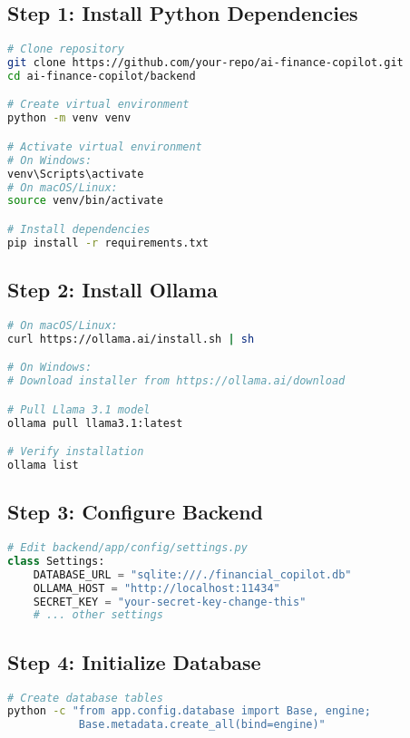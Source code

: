 \documentclass[11pt,a4paper]{report}
\begin{document}
\begin{itemize}

\subsection{Step 1: Install Python Dependencies}
\begin{lstlisting}[language=bash]
# Clone repository
git clone https://github.com/your-repo/ai-finance-copilot.git
cd ai-finance-copilot/backend

# Create virtual environment
python -m venv venv

# Activate virtual environment
# On Windows:
venv\Scripts\activate
# On macOS/Linux:
source venv/bin/activate

# Install dependencies
pip install -r requirements.txt
\end{lstlisting}

\subsection{Step 2: Install Ollama}
\begin{lstlisting}[language=bash]
# On macOS/Linux:
curl https://ollama.ai/install.sh | sh

# On Windows:
# Download installer from https://ollama.ai/download

# Pull Llama 3.1 model
ollama pull llama3.1:latest

# Verify installation
ollama list
\end{lstlisting}

\subsection{Step 3: Configure Backend}
\begin{lstlisting}[language=Python]
# Edit backend/app/config/settings.py
class Settings:
    DATABASE_URL = "sqlite:///./financial_copilot.db"
    OLLAMA_HOST = "http://localhost:11434"
    SECRET_KEY = "your-secret-key-change-this"
    # ... other settings
\end{lstlisting}

\subsection{Step 4: Initialize Database}
\begin{lstlisting}[language=bash]
# Create database tables
python -c "from app.config.database import Base, engine; 
           Base.metadata.create_all(bind=engine)"
\end{lstlisting}


\end{itemize}
\end{document}
